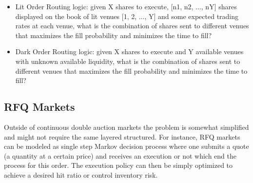 \begin{itemize}
    \begin{itemize}
        \item Lit Order Routing logic: given X shares to execute, [n1, n2, ..., nY] shares displayed on the book of lit venues [1, 2, ..., Y] and some expected trading rates at each venue, what is the combination of shares sent to different venues that maximizes the fill probability and minimizes the time to fill?
        \item Dark Order Routing logic: given X shares to execute and Y available venues with unknown available liquidity, what is the combination of shares sent to different venues that maximizes the fill probability and minimizes the time to fill?
    \end{itemize}

\end{itemize}


\subsection{RFQ Markets}
Outside of continuous double auction markets the problem is somewhat simplified and might not require the same layered structured. For instance, RFQ markets can be modeled as single step Markov decision process where one submits a quote (a quantity at a certain price) and receives an execution or not which end the process for this order. The execution policy can then be simply optimized to achieve a desired hit ratio or control inventory risk.